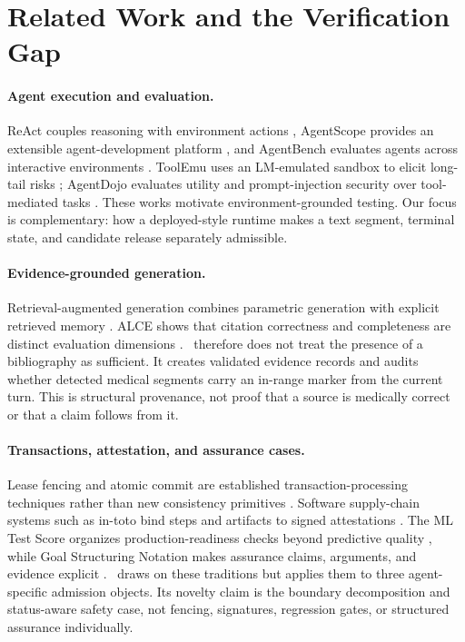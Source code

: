\section{Related Work and the Verification Gap}
\label{sec:related}

\paragraph{Agent execution and evaluation.}
ReAct couples reasoning with environment actions \citep{yao2023react},
AgentScope provides an extensible agent-development platform
\citep{gao2024agentscope}, and AgentBench evaluates agents across interactive
environments \citep{liu2024agentbench}.  ToolEmu uses an LM-emulated sandbox
to elicit long-tail risks \citep{ruan2024toolemu}; AgentDojo evaluates utility
and prompt-injection security over tool-mediated tasks
\citep{debenedetti2024agentdojo}.  These works motivate
environment-grounded testing.  Our focus is complementary: how a
deployed-style runtime makes a text segment, terminal state, and candidate
release separately admissible.

\paragraph{Evidence-grounded generation.}
Retrieval-augmented generation combines parametric generation with explicit
retrieved memory \citep{lewis2020rag}.  ALCE shows that citation correctness
and completeness are distinct evaluation dimensions \citep{gao2023alce}.
\system\ therefore does not treat the presence of a bibliography as
sufficient.  It creates validated evidence records and audits whether
detected medical segments carry an in-range marker from the current turn.
This is structural provenance, not proof that a source is medically correct
or that a claim follows from it.

\paragraph{Transactions, attestation, and assurance cases.}
Lease fencing and atomic commit are established transaction-processing
techniques rather than new consistency primitives \citep{gray1992transaction}.
Software supply-chain systems such as in-toto bind steps and artifacts to
signed attestations \citep{torresarias2019intoto}.  The ML Test Score
organizes production-readiness checks beyond predictive quality
\citep{breck2017mltestscore}, while Goal Structuring Notation makes assurance
claims, arguments, and evidence explicit \citep{spriggs2012gsn}.  \system\
draws on these traditions but applies them to three agent-specific admission
objects.  Its novelty claim is the boundary decomposition and status-aware
safety case, not fencing, signatures, regression gates, or structured
assurance individually.

